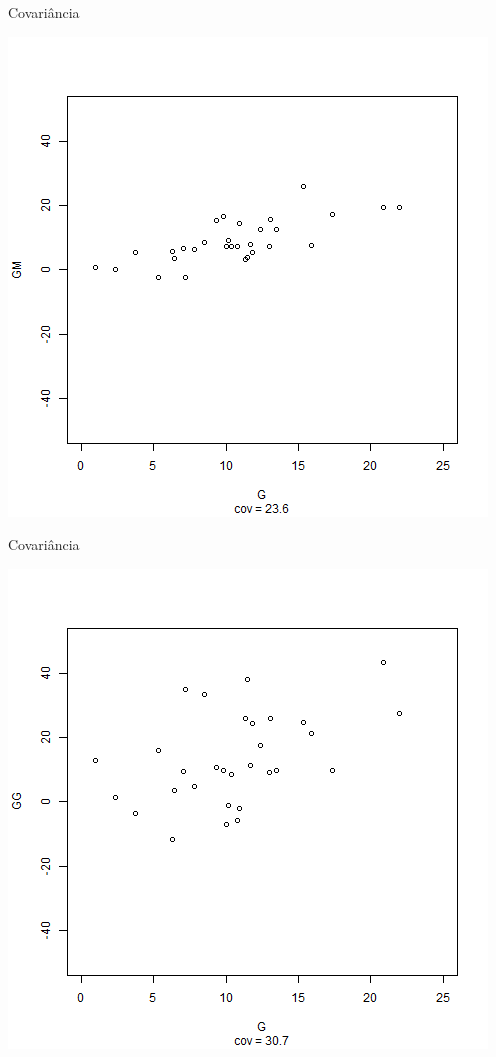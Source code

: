 \documentclass{beamer}
\begin{document}
\begin{frame}{Covariância}
  \begin{center}
    \includegraphics[height=.8\textheight]{Cap17/anim-2}
  \end{center}
\end{frame}

\begin{frame}{Covariância}
  \begin{center}
    \includegraphics[height=.8\textheight]{Cap17/anim-3}
  \end{center}
\end{frame}
\end{document}
